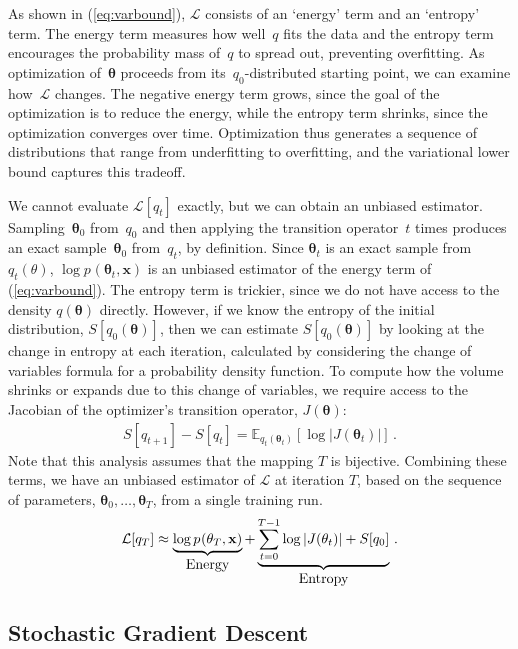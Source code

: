 \documentclass[]{article}
\newcommand{\vx}{\mathbf{x}}
\newcommand{\expectargs}[2]{\mathbb{E}_{#1} \left[ {#2} \right]}
\newcommand{\varL}{\mathcal{L}}
\newcommand{\data}{\vx}
\newcommand{\params}{\mathbf{\theta}}
\newcommand{\subjointdist}[2]{p_{#1}(\params_{#2} , \data)}
\begin{document}
As shown in (\ref{eq:varbound}), $\varL$ consists of an `energy' term and an `entropy' term.
The energy term measures how well~$q$ fits the data and the entropy term encourages the probability mass of~$q$ to spread out, preventing overfitting. 
As optimization of~$\params$ proceeds from its~$q_0$-distributed starting point, we can examine how~$\varL$ changes.
The negative energy term grows, since the goal of the optimization is to reduce the energy, while the entropy term shrinks, since the optimization converges over time.
Optimization thus generates a sequence of distributions that range from underfitting to overfitting, and the variational lower bound captures this tradeoff.

We cannot evaluate $\varL[q_t]$ exactly, but we can obtain an unbiased estimator.
Sampling~$\params_0$ from~$q_0$ and then applying the transition operator~$t$ times produces an exact sample~$\params_0$ from~$q_t$, by definition.
Since $\params_t$ is an exact sample from $q_t(\theta)$, $\log\subjointdist{}{t}$ is an unbiased estimator of the energy term of (\ref{eq:varbound}).
The entropy term is trickier, since we do not have access to the density $q(\params)$ directly.
However, if we know the entropy of the initial distribution, $S[q_0(\params)]$, then we can estimate $S[q_0(\params)]$ by looking at the change in entropy at each iteration, calculated by considering the change of variables formula for a probability density function.
To compute how the volume shrinks or expands due to this change of variables, we require access to the Jacobian of the optimizer's transition operator, $J(\params)$:
%
\begin{align}
S[q_{t+1}] - S[q_t] =
  \expectargs{q_t(\params_t)}{\log
    \left| J(\params_t) \right|} \,.
\end{align}
%
Note that this analysis assumes that the mapping $T$ is bijective.
Combining these terms, we have an unbiased estimator of $\varL$ at iteration $T$,
based on the sequence of parameters, $\params_0, \ldots, \params_T$, from a single training run.
\begin{align}
\varL[q_T] \approx
  \underbrace{\log \subjointdist{}{T}}_{\textnormal{\normalsize Energy}} +
  \underbrace{\sum_{t=0}^{T-1} \log \left| J(\params_t) \right| + S[q_0]}_{\textnormal{\normalsize Entropy}} \,.
\label{eq:entropy-bound}
\end{align}

\subsection{Stochastic Gradient Descent}
\end{document}
